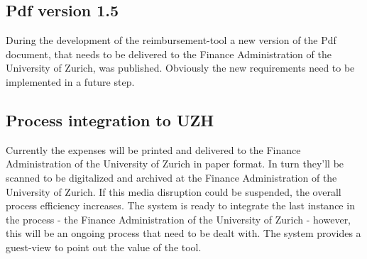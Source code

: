 \subsection{Pdf version 1.5}
During the development of the reimbursement-tool a new version of the Pdf document, that needs to be delivered to the Finance Administration of the University of Zurich, was published. Obviously the new requirements need to be implemented in a future step. 

\subsection{Process integration to UZH}
Currently the expenses will be printed and delivered to the Finance Administration of the University of Zurich in paper format. In turn they'll be scanned to be digitalized and archived at the Finance Administration of the University of Zurich. If this media disruption could be suspended, the overall process efficiency increases. The system is ready to integrate the last instance in the process - the Finance Administration of the University of Zurich - however, this will be an ongoing process that need to be dealt with. The system provides a guest-view to point out the value of the tool.

